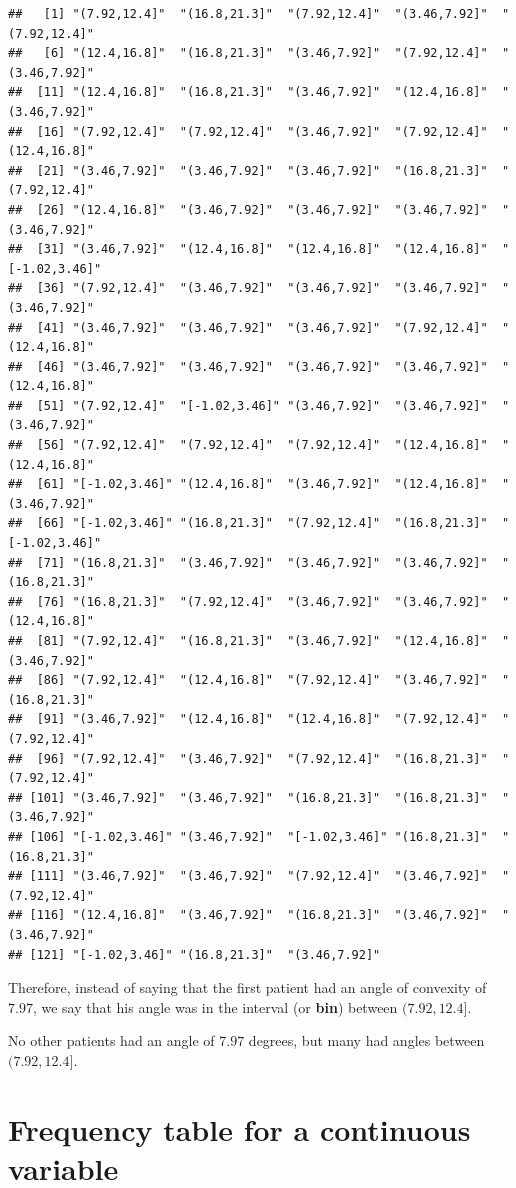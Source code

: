 \documentclass[
]{book}
\begin{document}
\begin{verbatim}
##   [1] "(7.92,12.4]"  "(16.8,21.3]"  "(7.92,12.4]"  "(3.46,7.92]"  "(7.92,12.4]" 
##   [6] "(12.4,16.8]"  "(16.8,21.3]"  "(3.46,7.92]"  "(7.92,12.4]"  "(3.46,7.92]" 
##  [11] "(12.4,16.8]"  "(16.8,21.3]"  "(3.46,7.92]"  "(12.4,16.8]"  "(3.46,7.92]" 
##  [16] "(7.92,12.4]"  "(7.92,12.4]"  "(3.46,7.92]"  "(7.92,12.4]"  "(12.4,16.8]" 
##  [21] "(3.46,7.92]"  "(3.46,7.92]"  "(3.46,7.92]"  "(16.8,21.3]"  "(7.92,12.4]" 
##  [26] "(12.4,16.8]"  "(3.46,7.92]"  "(3.46,7.92]"  "(3.46,7.92]"  "(3.46,7.92]" 
##  [31] "(3.46,7.92]"  "(12.4,16.8]"  "(12.4,16.8]"  "(12.4,16.8]"  "[-1.02,3.46]"
##  [36] "(7.92,12.4]"  "(3.46,7.92]"  "(3.46,7.92]"  "(3.46,7.92]"  "(3.46,7.92]" 
##  [41] "(3.46,7.92]"  "(3.46,7.92]"  "(3.46,7.92]"  "(7.92,12.4]"  "(12.4,16.8]" 
##  [46] "(3.46,7.92]"  "(3.46,7.92]"  "(3.46,7.92]"  "(3.46,7.92]"  "(12.4,16.8]" 
##  [51] "(7.92,12.4]"  "[-1.02,3.46]" "(3.46,7.92]"  "(3.46,7.92]"  "(3.46,7.92]" 
##  [56] "(7.92,12.4]"  "(7.92,12.4]"  "(7.92,12.4]"  "(12.4,16.8]"  "(12.4,16.8]" 
##  [61] "[-1.02,3.46]" "(12.4,16.8]"  "(3.46,7.92]"  "(12.4,16.8]"  "(3.46,7.92]" 
##  [66] "[-1.02,3.46]" "(16.8,21.3]"  "(7.92,12.4]"  "(16.8,21.3]"  "[-1.02,3.46]"
##  [71] "(16.8,21.3]"  "(3.46,7.92]"  "(3.46,7.92]"  "(3.46,7.92]"  "(16.8,21.3]" 
##  [76] "(16.8,21.3]"  "(7.92,12.4]"  "(3.46,7.92]"  "(3.46,7.92]"  "(12.4,16.8]" 
##  [81] "(7.92,12.4]"  "(16.8,21.3]"  "(3.46,7.92]"  "(12.4,16.8]"  "(3.46,7.92]" 
##  [86] "(7.92,12.4]"  "(12.4,16.8]"  "(7.92,12.4]"  "(3.46,7.92]"  "(16.8,21.3]" 
##  [91] "(3.46,7.92]"  "(12.4,16.8]"  "(12.4,16.8]"  "(7.92,12.4]"  "(7.92,12.4]" 
##  [96] "(7.92,12.4]"  "(3.46,7.92]"  "(7.92,12.4]"  "(16.8,21.3]"  "(7.92,12.4]" 
## [101] "(3.46,7.92]"  "(3.46,7.92]"  "(16.8,21.3]"  "(16.8,21.3]"  "(3.46,7.92]" 
## [106] "[-1.02,3.46]" "(3.46,7.92]"  "[-1.02,3.46]" "(16.8,21.3]"  "(16.8,21.3]" 
## [111] "(3.46,7.92]"  "(3.46,7.92]"  "(7.92,12.4]"  "(3.46,7.92]"  "(7.92,12.4]" 
## [116] "(12.4,16.8]"  "(3.46,7.92]"  "(16.8,21.3]"  "(3.46,7.92]"  "(3.46,7.92]" 
## [121] "[-1.02,3.46]" "(16.8,21.3]"  "(3.46,7.92]"
\end{verbatim}

Therefore, instead of saying that the first patient had an angle of convexity of \(7.97\), we say that his angle was in the interval (or \textbf{bin}) between \((7.92,12.4]\).

No other patients had an angle of \(7.97\) degrees, but many had angles between \((7.92,12.4]\).

\hypertarget{frequency-table-for-a-continuous-variable}{%
\section{Frequency table for a continuous variable}\label{frequency-table-for-a-continuous-variable}}
\end{document}
